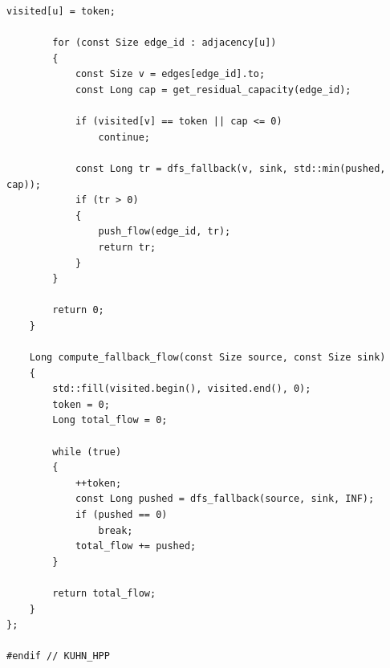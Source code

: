 \begin{lstlisting}[caption={Implementação em C++ do algoritmo de Kuhn para emparelhamento bipartido máximo.}, label={lst:kuhn}]
		visited[u] = token;

		for (const Size edge_id : adjacency[u])
		{
			const Size v = edges[edge_id].to;
			const Long cap = get_residual_capacity(edge_id);

			if (visited[v] == token || cap <= 0)
				continue;

			const Long tr = dfs_fallback(v, sink, std::min(pushed, cap));
			if (tr > 0)
			{
				push_flow(edge_id, tr);
				return tr;
			}
		}

		return 0;
	}

	Long compute_fallback_flow(const Size source, const Size sink)
	{
		std::fill(visited.begin(), visited.end(), 0);
		token = 0;
		Long total_flow = 0;

		while (true)
		{
			++token;
			const Long pushed = dfs_fallback(source, sink, INF);
			if (pushed == 0)
				break;
			total_flow += pushed;
		}

		return total_flow;
	}
};

#endif // KUHN_HPP
\end{lstlisting}
